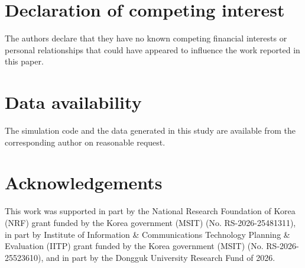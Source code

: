 \documentclass[a4paper,fleqn]{cas-dc}
\begin{document}
\section*{Declaration of competing interest}

The authors declare that they have no known competing financial interests or
personal relationships that could have appeared to influence the work reported
in this paper.

\section*{Data availability}

The simulation code and the data generated in this study are available from the
corresponding author on reasonable request.

\printcredits

\section*{Acknowledgements}

This work was supported in part by the National Research Foundation of Korea
(NRF) grant funded by the Korea government (MSIT) (No. RS-2026-25481311), in
part by Institute of Information \& Communications Technology Planning \&
Evaluation (IITP) grant funded by the Korea government (MSIT)
(No. RS-2026-25523610), and in part by the Dongguk University Research Fund of
2026.



\end{document}
